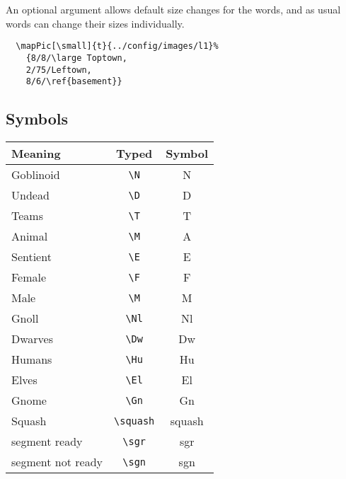 \documentclass[a4paper,openany]{book}
\begin{document}
\begin{multicols}{2}
An optional argument allows default size changes for the words, and as usual words can change their sizes individually.

\begin{verbatim}
  \mapPic[\small]{t}{../config/images/l1}%
    {8/8/\large Toptown,
    2/75/Leftown,
    8/6/\ref{basement}}
\end{verbatim}

\subsection{Symbols}

\begin{tabularx}{\linewidth}{Xcc}

  Meaning & Typed & Symbol \\\hline

  Goblinoid & {\tt \textbackslash{N}} & \gls{N} \\

  Undead & {\tt \textbackslash{D}} & \gls{D} \\
  \hline
  Teams & {\tt \textbackslash{T}} & \gls{T} \\

  Animal & {\tt \textbackslash{M}} & \gls{A} \\

  Sentient & {\tt \textbackslash{E}} & \gls{E} \\

  Female & {\tt \textbackslash{F}} & \gls{F} \\

  Male & {\tt \textbackslash{M}} & \gls{M} \\

  \hline
  Gnoll & {\tt \textbackslash{Nl}} & \gls{Nl} \\

  Dwarves & {\tt \textbackslash{Dw}} & \gls{Dw} \\

  Humans & {\tt \textbackslash{Hu}} & \gls{Hu} \\

  Elves & {\tt \textbackslash{El}} & \gls{El} \\

  Gnome & {\tt \textbackslash{Gn}} & \gls{Gn} \\
  \hline
  Squash & {\tt \textbackslash{squash}} & \gls{squash} \\

  \Gls{segment} ready & {\tt \textbackslash{sgr}} & \gls{sgr} \\

  \Gls{segment} not ready & {\tt \textbackslash{sgn}} & \gls{sgn} \\

\end{tabularx}

\end{multicols}
\end{document}
